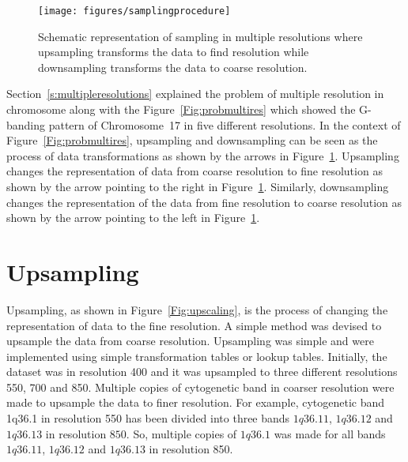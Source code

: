 \begin{figure}[h!]
\centering
\texttt{[image: figures/samplingprocedure]}
\caption[Sampling in Multiple Resolution]{Schematic representation of sampling in multiple resolutions where upsampling transforms the data to find resolution while downsampling transforms the data to coarse resolution.} \label{Fig:samplinginmultires}
\end{figure} 

Section~\ref{s:multipleresolutions} explained the problem of multiple resolution in chromosome along with the Figure~\ref{Fig:probmultires} which showed the G-banding pattern of Chromosome~17 in five different resolutions. In the context of Figure~\ref{Fig:probmultires}, upsampling and downsampling can be seen as the process of data transformations as shown by the arrows in Figure~\ref{Fig:samplinginmultires}. Upsampling changes the representation of data from coarse resolution to fine resolution as shown by the arrow pointing to the right in Figure~\ref{Fig:samplinginmultires}. Similarly, downsampling changes the representation of the data from fine resolution to coarse resolution as shown by the arrow pointing to the left in Figure~\ref{Fig:samplinginmultires}.


\section{Upsampling}
\label{s:upsampling}

Upsampling, as shown in Figure~\ref{Fig:upscaling}, is the process of changing the representation of data to the fine resolution. A simple method was devised to upsample the data from coarse resolution. Upsampling was simple and were implemented using simple transformation tables or lookup tables. Initially, the dataset was in resolution 400 and it was upsampled to three different resolutions 550, 700 and 850. Multiple copies of cytogenetic band in coarser resolution were made to upsample the data to finer resolution. For example, cytogenetic band 1q36.1 in resolution 550 has been divided into three bands $1q36.11$, $1q36.12$ and $1q36.13$ in resolution $850$. So, multiple copies of $1q36.1$ was made for all bands $1q36.11$, $1q36.12$ and $1q36.13$ in resolution 850. %

